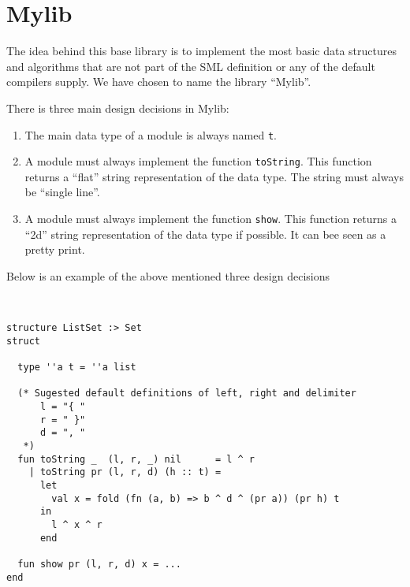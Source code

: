 \section{Mylib}

The idea behind this base library is to implement the most basic data structures
and algorithms that are not part of the SML definition or any of the default
compilers supply. We have chosen to name the library ``Mylib''.

There is three main design decisions in Mylib:



\begin{enumerate}
\item The main data type of a module is always named \texttt{t}.

\item A module must always implement the function \texttt{toString}. This
  function returns a ``flat'' string representation of the data type. The string
  must always be ``single line''.

\item A module must always implement the function \texttt{show}. This function
  returns a ``2d'' string representation of the data type if possible. It can
  bee seen as a pretty print. 
\end{enumerate}


Below is an example of the above mentioned three design decisions

\begin{example}\
\begin{lstlisting}
structure ListSet :> Set
struct

  type ''a t = ''a list

  (* Sugested default definitions of left, right and delimiter
      l = "{ "
      r = " }"
      d = ", "
   *)
  fun toString _  (l, r, _) nil      = l ^ r
    | toString pr (l, r, d) (h :: t) =
      let
        val x = fold (fn (a, b) => b ^ d ^ (pr a)) (pr h) t 
      in
        l ^ x ^ r
      end

  fun show pr (l, r, d) x = ...
end

\end{lstlisting}
\end{example}

